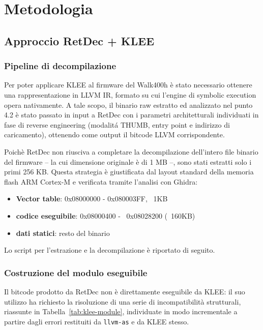 \chapter{Metodologia}
    \label{chap:metodologia}
        \section{Approccio RetDec + KLEE}
            \label{subsec:retdec+klee}
            \subsection{Pipeline di decompilazione}
            \label{subsec:pipeline_decompilazione}
                Per poter applicare KLEE al firmware del Walk400h è stato necessario ottenere una rappresentazione in LLVM IR, formato su cui l'engine di symbolic execution opera nativamente. A tale scopo, il binario raw estratto ed analizzato nel punto 4.2 è stato passato in input a RetDec con i parametri architetturali individuati in fase di reverse engineering (modalitá THUMB, entry point e indirizzo di caricamento), ottenendo come output il bitcode LLVM corrispondente.
    
                Poichè RetDec non riusciva a completare la decompilazione dell'intero file binario del firmware -- la cui dimensione originale è di 1 MB --, sono stati estratti solo i primi 256 KB. Questa strategia è giustificata dal layout standard della memoria flash ARM Cortex-M e verificata tramite l'analisi con Ghidra:
                    \begin{itemize}[noitemsep]
                        \item \textbf{Vector table}: 0x08000000 - 0x080003FF, ~1KB
                        \item \textbf{codice eseguibile}: 0x08000400 - ~0x08028200 (~160KB)
                        \item \textbf{dati statici}: resto del binario
                    \end{itemize}
    
                Lo script per l'estrazione e la decompilazione è riportato di seguito.


                \subsection{Costruzione del modulo eseguibile}
                \label{subsec:costruzione_modulo_eseguibile}
                Il bitcode prodotto da RetDec non è direttamente eseguibile da KLEE: 
                il suo utilizzo ha richiesto la risoluzione di una serie di 
                incompatibilità strutturali, riassunte in 
                Tabella~\ref{tab:klee-module}, individuate in modo incrementale a 
                partire dagli errori restituiti da \texttt{llvm-as} e da KLEE stesso.
                
